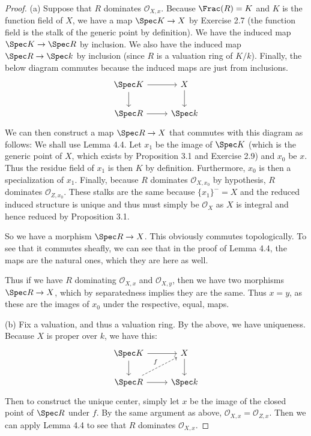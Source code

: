 \begin{proof}
	(a) Suppose that $R $ dominates $\mathcal{O}_{X,x} $.
	Because $\Frac(R) = K $ and $K $ is the function field of $X $, we have a map $\Spec K \to X $ by Exercise 2.7 (the function field is the stalk of the generic point by definition).
	We have the induced map $\Spec K\to \Spec R $ by inclusion.
	We also have the induced map $\Spec R \to \Spec k $ by inclusion (since $R $ is a valuation ring of $K / k $).
	Finally, the below diagram commutes because the induced maps are just from inclusions.
	\[
	\begin{tikzcd}
	\Spec K & X\\
	\Spec R & \Spec k
	\arrow[from=1-1,to=1-2]
	\arrow[from=1-1,to=2-1]
	\arrow[from=2-1,to=2-2]
	\arrow[from=1-2,to=2-2]
	\end{tikzcd}
	\]
	We can then construct a map $\Spec R\to X $ that commutes with this diagram as follows:
	We shall use Lemma 4.4.
	Let $x_{1}$ be the image of $\Spec K $ (which is the generic point of $X $, which exists by Proposition 3.1 and Exercise 2.9) and $x_{0} $ be $x $.
	Thus the residue field of $x_{1} $ is then $K $ by definition.
	Furthermore, $x_{0} $ is then a specialization of $x_{1} $.
	Finally, because $R $ dominates $\mathcal{O}_{X,x_{0}} $ by hypothesis, $R $ dominates $\mathcal{O}_{Z,x_{0}} $.
	These stalks are the same because $\{x_{1}\}^- = X  $ and the reduced induced structure is unique and thus must simply be $\mathcal{O}_X $ as $X $ is integral and hence reduced by Proposition 3.1.

	So we have a morphism $\Spec R \to X $.
	This obviously commutes topologically.
	To see that it commutes sheafly, we can see that in the proof of Lemma 4.4, the maps are the natural ones, which they are here as well.

	Thus if we have $R $ dominating $\mathcal{O}_{X,x} $ and $\mathcal{O}_{X,y} $, then we have two morphisms $\Spec R\to X $, which by separatedness implies they are the same.
	Thus $x=y $, as these are the images of $x_{0} $ under the respective, equal, maps.

	(b) Fix a valuation, and thus a valuation ring.
	By the above, we have uniqueness.
	Because $X $ is proper over $k $, we have this:
	\[
	\begin{tikzcd}
	\Spec K & X\\
	\Spec R & \Spec k
	\arrow[from=1-1,to=1-2]
	\arrow[from=1-1,to=2-1]
	\arrow[from=2-1,to=2-2]
	\arrow[from=1-2,to=2-2]
	\arrow["f",dashed,from=2-1,to=1-2]
	\end{tikzcd}
	\]
	Then to construct the unique center, simply let $x $ be the image of the closed point of $\Spec R $ under $f $.
	By the same argument as above, $\mathcal{O}_{X,x} = \mathcal{O}_{Z,x} $.
	Then we can apply Lemma 4.4 to see that $R $ dominates $\mathcal{O}_{X,x}$.


\end{proof}
